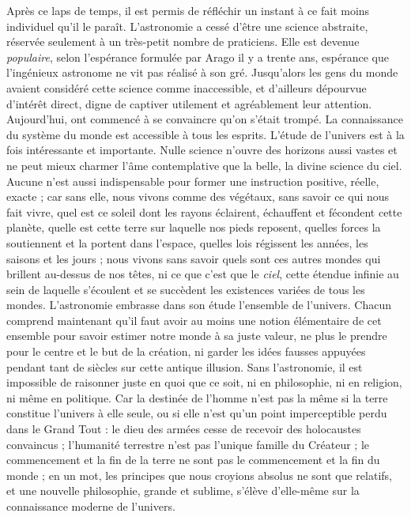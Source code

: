\documentclass[a4paper, 11pt, oneside]{article}
\begin{document}
Après ce laps de temps, il est permis de réfléchir un instant à ce fait moins individuel qu'il le paraît. L'astronomie a cessé d'être une science abstraite, réservée seulement à un très-petit nombre de praticiens. Elle est devenue \emph{populaire}, selon l'espérance formulée par Arago il y a trente ans, espérance que l'ingénieux astronome ne vit pas réalisé à son gré. Jusqu'alors les gens du monde avaient considéré cette science comme inaccessible, et d'ailleurs dépourvue d'intérêt direct, digne de captiver utilement et agréablement leur attention. Aujourd'hui, ont commencé à se convaincre qu'on s'était trompé. La connaissance du système du monde est accessible à tous les esprits. L'étude de l'univers est à la fois intéressante et importante. Nulle science n'ouvre des horizons aussi vastes et ne peut mieux charmer l'âme contemplative que la belle, la divine science du ciel. Aucune n'est aussi indispensable pour former une instruction positive, réelle, exacte ; car sans elle, nous vivons comme des végétaux, sans savoir ce qui nous fait vivre, quel est ce soleil dont les rayons éclairent, échauffent et fécondent cette planète, quelle est cette terre sur laquelle nos pieds reposent, quelles forces la soutiennent et la portent dans l'espace, quelles lois régissent les années, les saisons et les jours ; nous vivons sans savoir quels sont ces autres mondes qui brillent au-dessus de nos têtes, ni ce que c'est que le \emph{ciel}, cette étendue infinie au sein de laquelle s'écoulent et se succèdent les existences variées de tous les mondes. L'astronomie embrasse dans son étude l'ensemble de l'univers. Chacun comprend maintenant qu'il faut avoir au moins une notion élémentaire de cet ensemble pour savoir estimer notre monde à sa juste valeur, ne plus le prendre pour le centre et le but de la création, ni garder les idées fausses appuyées pendant tant de siècles sur cette antique illusion. Sans l'astronomie, il est impossible de raisonner juste en quoi que ce soit, ni en philosophie, ni en religion, ni même en politique. Car la destinée de l'homme n'est pas la même si la terre constitue l'univers à elle seule, ou si elle n'est qu'un point imperceptible perdu dans le Grand Tout : le dieu des armées cesse de recevoir des holocaustes convaincus ; l'humanité terrestre n'est pas l'unique famille du Créateur ; le commencement et la fin de la terre ne sont pas le commencement et la fin du monde ; en un mot, les principes que nous croyions absolus ne sont que relatifs, et une nouvelle philosophie, grande et sublime, s'élève d'elle-même sur la connaissance moderne de l'univers.
\end{document}
